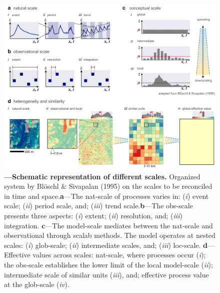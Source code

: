 \documentclass[./main_en.tex]{subfiles}
\begin{document}
\begin{figure}[t!] 
\centering				
\includegraphics[width=0.98\linewidth]{figs/fig_scale_en.jpg}		
\caption[Schematic representation of different scales]
{\textbf{---\;Schematic representation of different scales.}
    Organized system by Blöschl \& Sivapalan (1995) \cite{Bloschl1995a} on the scales to be reconciled in time and space.\;\textbf{a}\;---\;The \gls{nat-scale} of processes varies in: (\textrm{\textit{i}}) event scale; (\textrm{\textit{ii}}) period scale, and; (\textrm{\textit{iii}}) trend scale.\;\textbf{b}\;---\;The \gls{obs-scale} presents three aspects: (\textrm{\textit{i}}) extent; (\textrm{\textit{ii}}) resolution, and; (\textrm{\textit{iii}}) integration.
    \;\textbf{c}\;---\;The \gls{model-scale} mediates between the \gls{nat-scale} and observational through \gls{scalab} methods. The \gls{model} operates at nested scales: (\textrm{\textit{i}}) \gls{glob-scale}; (\textrm{\textit{ii}}) intermediate scales, and; (\textrm{\textit{iii}}) \gls{loc-scale}.
    \;\textbf{d}\;---\;Effective values across scales: \gls{nat-scale}, where processes occur (\textrm{\textit{i}}); the \gls{obs-scale} establishes the lower limit of the local \gls{model-scale} (\textrm{\textit{ii}}); intermediate scale of similar units (\textrm{\textit{iii}}), and; effective process value at the \gls{glob-scale} (\textrm{\textit{iv}}).
}
\label{fig:hydro:scaling} 		
\end{figure}
\end{document}
